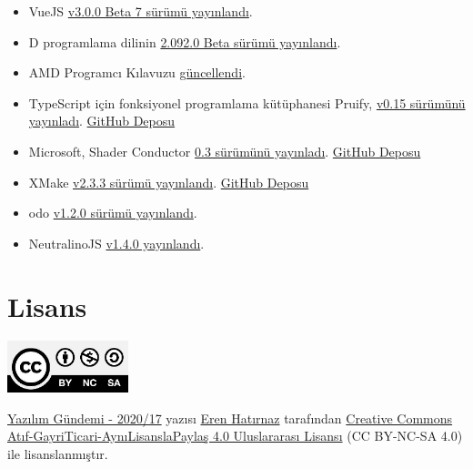 \documentclass[11pt]{article}
\begin{document}
\begin{itemize}
\item VueJS \href{https://github.com/vuejs/vue-next/releases/tag/v3.0.0-beta.7}{v3.0.0 Beta 7 sürümü yayınlandı}.
\item D programlama dilinin \href{https://dlang.org/changelog/2.092.0.html}{2.092.0 Beta sürümü yayınlandı}.
\item AMD Programcı Kılavuzu \href{https://www.phoronix.com/scan.php?page=news\_item\&px=AMD-PRM-PCID-PKEY}{güncellendi}.
\item TypeScript için fonksiyonel programlama kütüphanesi Pruify, \href{https://gigobyte.github.io/purify/changelog/0.15/}{v0.15 sürümünü
yayınladı}. \href{https://github.com/gigobyte/purify}{GitHub Deposu}
\item Microsoft, Shader Conductor \href{https://www.phoronix.com/scan.php?page=news\_item\&px=Microsoft-Shader-Conductor-0.3}{0.3 sürümünü yayınladı}. \href{https://github.com/microsoft/ShaderConductor}{GitHub Deposu}
\item XMake \href{https://tboox.org/2020/04/27/xmake-update-v2.3.3/}{v2.3.3 sürümü yayınlandı}. \href{https://github.com/xmake-io/xmake}{GitHub Deposu}
\item odo \href{https://github.com/openshift/odo/releases/tag/v1.2.0}{v1.2.0 sürümü yayınlandı}.
\item NeutralinoJS \href{https://github.com/neutralinojs/neutralinojs/releases/tag/v1.4.0}{v1.4.0 yayınlandı}.
\end{itemize}
\section{Lisans}
\label{sec:orgefc98d0}
\begin{center}
\begin{center}
\includegraphics[height=1.5cm]{../../../img/CC_BY-NC-SA_4.0.png}
\end{center}

\href{yazilim-gundemi-2020-17.pdf}{Yazılım Gündemi - 2020/17} yazısı \href{https://erenhatirnaz.github.io}{Eren Hatırnaz} tarafından \href{http://creativecommons.org/licenses/by-nc-sa/4.0/}{Creative Commons
Atıf-GayriTicari-AynıLisanslaPaylaş 4.0 Uluslararası Lisansı} (CC BY-NC-SA 4.0)
ile lisanslanmıştır.
\end{center}
\end{document}
